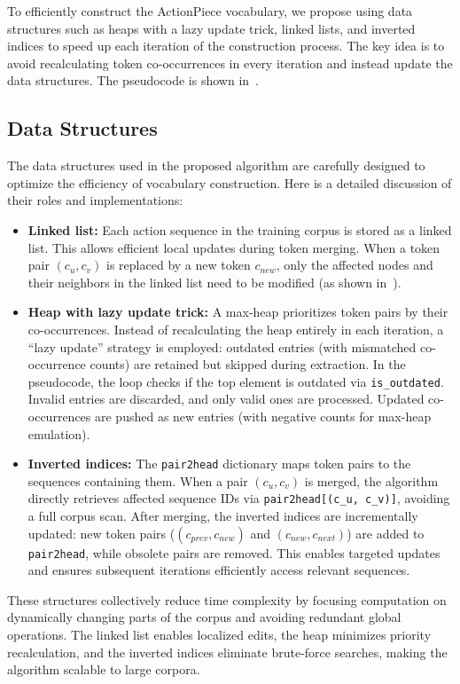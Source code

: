 To efficiently construct the ActionPiece vocabulary, we propose using data structures such as heaps with a lazy update trick, linked lists, and inverted indices to speed up each iteration of the construction process. The key idea is to avoid recalculating token co-occurrences in every iteration and instead update the data structures. The pseudocode is shown in~.

\subsection{Data Structures}

The data structures used in the proposed algorithm are carefully designed to optimize the efficiency of vocabulary construction. Here is a detailed discussion of their roles and implementations:
\begin{itemize}
    \item \textbf{Linked list:}  
    Each action sequence in the training corpus is stored as a linked list. This allows efficient local updates during token merging. When a token pair $(c_u, c_v)$ is replaced by a new token $c_{new}$, only the affected nodes and their neighbors in the linked list need to be modified (as shown in~).
    \item \textbf{Heap with lazy update trick:}  
    A max-heap prioritizes token pairs by their co-occurrences. Instead of recalculating the heap entirely in each iteration, a ``lazy update'' strategy is employed: outdated entries (with mismatched co-occurrence counts) are retained but skipped during extraction. In the pseudocode, the loop checks if the top element is outdated via \texttt{is\_outdated}. Invalid entries are discarded, and only valid ones are processed. Updated co-occurrences are pushed as new entries (with negative counts for max-heap emulation).
    \item \textbf{Inverted indices:}  
    The \texttt{pair2head} dictionary maps token pairs to the sequences containing them. When a pair $(c_u, c_v)$ is merged, the algorithm directly retrieves affected sequence IDs via \texttt{pair2head[(c\_u, c\_v)]}, avoiding a full corpus scan. After merging, the inverted indices are incrementally updated: new token pairs (\eg $(c_{prev}, c_{new})$ and $(c_{new}, c_{next})$) are added to \texttt{pair2head}, while obsolete pairs are removed. This enables targeted updates and ensures subsequent iterations efficiently access relevant sequences.
\end{itemize}
These structures collectively reduce time complexity by focusing computation on dynamically changing parts of the corpus and avoiding redundant global operations. The linked list enables localized edits, the heap minimizes priority recalculation, and the inverted indices eliminate brute-force searches, making the algorithm scalable to large corpora.

